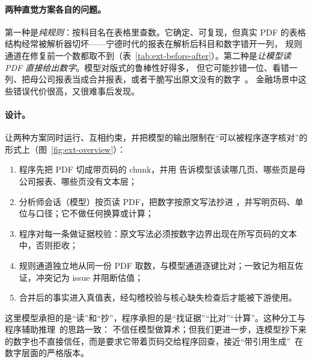 \paragraph{两种直觉方案各自的问题。}
第一种是\emph{纯规则}：按科目名在表格里查数。它确定、可复现，但真实 PDF 的表格结构经常被解析器切坏——宁德时代的报表在解析后科目和数字错开一列，
规则通道在修复前一个数都取不到（表~\ref{tab:ext-before-after}）。第二种是\emph{让模型读 PDF 直接给出数字}。模型对版式的鲁棒性好得多，
但它可能抄错一位、看错一列、把母公司报表当成合并报表，或者干脆写出原文没有的数字~\citep{ji2023survey}。
金融场景中这些错误代价很高，又很难事后发现。

\paragraph{设计。}
\sysname{}让两种方案同时运行、互相约束，并把模型的输出限制在“可以被程序逐字核对”的形式上（图~\ref{fig:ext-overview}）：
\begin{enumerate}
\item 程序先把 PDF 切成带页码的 chunk，并用  告诉模型该读哪几页、哪些页是母公司报表、哪些页没有文本层；
\item 分析师会话（模型）按页读 PDF，把数字按原文写法抄进 ，并写明页码、单位与口径；它不做任何换算或计算；
\item 程序对每一条做证据校验：原文写法必须按数字边界出现在所写页码的文本中，否则拒收；
\item 规则通道独立地从同一份 PDF 取数，与模型通道逐键比对；一致记为相互佐证，冲突记为 issue 并阻断估值；
\item 合并后的事实进入真值表，经勾稽校验与核心缺失检查后才能被下游使用。
\end{enumerate}
这里模型承担的是“读”和“抄”，程序承担的是“找证据”“比对”“计算”。这种分工与程序辅助推理~\citep{gao2023pal,chen2023pot}的思路一致：
不信任模型做算术；但我们更进一步，连模型抄下来的数字也不直接信任，而是要求它带着页码交给程序回查，接近“带引用生成”~\citep{gao2023alce}在数字层面的严格版本。

